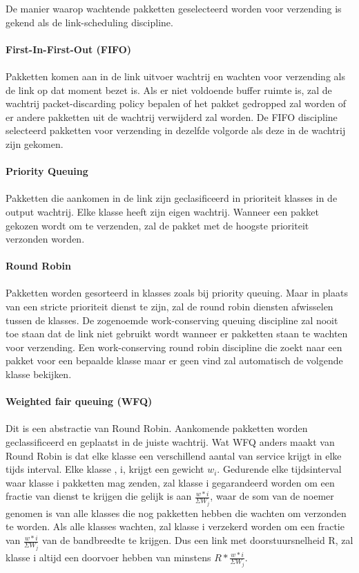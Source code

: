 De manier waarop wachtende pakketten geselecteerd worden voor verzending is gekend als de link-scheduling discipline.
\\\\
\textbf{First-In-First-Out (FIFO)}
\\\\
Pakketten komen aan in de link uitvoer wachtrij en wachten voor verzending als de link op dat moment bezet is. Als er niet voldoende buffer ruimte is, zal de wachtrij packet-discarding policy bepalen of het pakket gedropped zal worden of er andere pakketten uit de wachtrij verwijderd zal worden.
De FIFO discipline selecteerd pakketten voor verzending in dezelfde volgorde als deze in de wachtrij zijn gekomen.
\\\\
\textbf{Priority Queuing}
\\\\
Pakketten die aankomen in de link zijn geclasificeerd in prioriteit klasses in de output wachtrij. Elke klasse heeft zijn eigen wachtrij. Wanneer een pakket gekozen wordt om te verzenden, zal de pakket met de hoogste prioriteit verzonden worden.
\\\\
\textbf{Round Robin}
\\\\
Pakketten worden gesorteerd in klasses zoals bij priority queuing. Maar in plaats van een stricte prioriteit dienst te zijn, zal de round robin diensten afwisselen tussen de klasses. De zogenoemde work-conserving queuing discipline zal nooit toe staan dat de link niet gebruikt wordt wanneer er pakketten staan te wachten voor verzending. Een work-conserving round robin discipline die zoekt naar een pakket voor een bepaalde klasse maar er geen vind zal automatisch de volgende klasse bekijken.
\\\\
\textbf{Weighted fair queuing (WFQ)}
\\\\
Dit is een abstractie van Round Robin. Aankomende pakketten worden geclassificeerd en geplaatst in de juiste wachtrij. Wat WFQ anders maakt van Round Robin is dat elke klasse een verschillend aantal van service krijgt in elke tijds interval. Elke klasse , i, krijgt een gewicht $w_i$. Gedurende elke tijdsinterval waar klasse i pakketten mag zenden, zal klasse i gegarandeerd worden om een fractie van dienst te krijgen die gelijk is aan $\frac{w*i}{\Sigma W_j}$, waar de som van de noemer genomen is van alle klasses die nog pakketten hebben die wachten om verzonden te worden. Als alle klasses wachten, zal klasse i verzekerd worden om een fractie van $\frac{w*i}{\Sigma W_j}$ van de bandbreedte te krijgen.
Dus een link met doorstuursnelheid R, zal klasse i altijd een doorvoer hebben van minstens $R * \frac{w*i}{\Sigma W_j}$.

